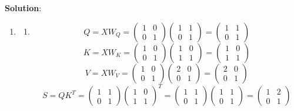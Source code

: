 \documentclass[submit]{../harvardml}
\newenvironment{solution}{
    \vspace{2mm}
    \color{blue}\noindent\textbf{Solution}:
}{}
\begin{document}
\newpage


\begin{solution}
	\begin{enumerate}
        \item
            \begin{enumerate}
                \item 
                    $$Q = XW_Q = \begin{pmatrix} 1 & 0 \\ 0 & 1 \end{pmatrix}\begin{pmatrix} 1 & 1 \\ 0 & 1 \end{pmatrix} = \begin{pmatrix} 1 & 1 \\ 0 & 1 \end{pmatrix}$$
                    $$K = XW_K = \begin{pmatrix} 1 & 0 \\ 0 & 1 \end{pmatrix}\begin{pmatrix} 1 & 0 \\1 & 1 \end{pmatrix} = \begin{pmatrix} 1 & 0 \\ 1 & 1 \end{pmatrix}$$
                    $$V = XW_V = \begin{pmatrix} 1 & 0 \\ 0 & 1 \end{pmatrix}\begin{pmatrix} 2 & 0 \\0 & 1 \end{pmatrix} = \begin{pmatrix} 2 & 0 \\ 0 & 1 \end{pmatrix}$$
                    $$S = QK^T = \begin{pmatrix} 1 & 1 \\ 0 & 1 \end{pmatrix}\begin{pmatrix} 1 & 0 \\ 1 & 1 \end{pmatrix}^T = \begin{pmatrix} 1 & 1 \\ 0 & 1 \end{pmatrix}\begin{pmatrix} 1 & 1 \\ 0 & 1 \end{pmatrix} = \begin{pmatrix} 1 & 2 \\ 0 & 1 \end{pmatrix}$$

\end{enumerate}
\end{enumerate}
\end{solution}
\end{document}
